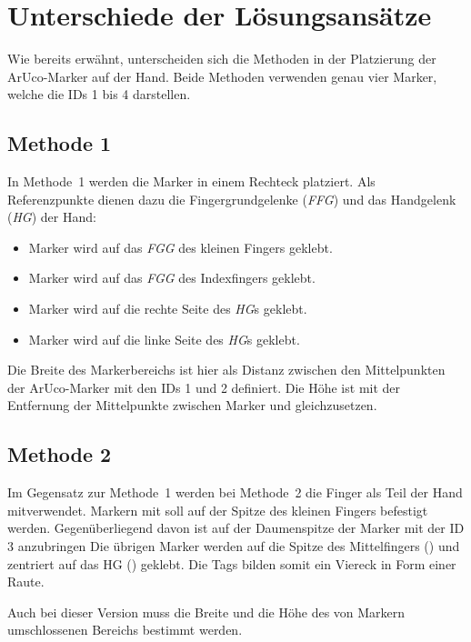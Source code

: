 \section{Unterschiede der Lösungsansätze}
\label{sec:diff_meth}

Wie bereits erwähnt, unterscheiden sich die Methoden in der Platzierung der ArUco-Marker auf der Hand.
Beide Methoden verwenden genau vier Marker, welche die IDs 1 bis 4 darstellen.

\subsection{Methode 1}
In Methode~1 werden die Marker in einem Rechteck platziert.
Als Referenzpunkte dienen dazu die Fingergrundgelenke (\textit{FFG}) und das Handgelenk (\textit{HG}) der Hand:

\begin{itemize}
    \item Marker  wird auf das \textit{FGG} des kleinen Fingers geklebt.
    \item Marker  wird auf das \textit{FGG} des Indexfingers geklebt.
    \item Marker  wird auf die rechte Seite des \textit{HG}s geklebt.
    \item Marker  wird auf die linke Seite des \textit{HG}s geklebt.
\end{itemize}

Die Breite des Markerbereichs ist hier als Distanz zwischen den Mittelpunkten der ArUco-Marker mit den IDs 1 und 2 definiert.
Die Höhe ist mit der Entfernung der Mittelpunkte zwischen Marker  und  gleichzusetzen.

\subsection{Methode 2}
Im Gegensatz zur Methode~1 werden bei Methode~2 die Finger als Teil der Hand mitverwendet.
Markern mit  soll auf der Spitze des kleinen Fingers befestigt werden.
Gegenüberliegend davon ist auf der Daumenspitze der Marker mit der ID 3 anzubringen
Die übrigen Marker werden auf die Spitze des Mittelfingers () und zentriert auf das HG () geklebt.
Die Tags bilden somit ein Viereck in Form einer Raute.

Auch bei dieser Version muss die Breite und die Höhe des von Markern umschlossenen Bereichs bestimmt werden.

